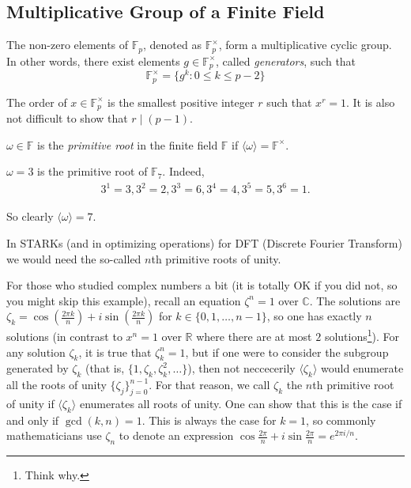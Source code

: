 \documentclass[../lecture-notes.tex]{subfiles}
\begin{document}
\subsection{Multiplicative Group of a Finite Field}

The non-zero elements of $\mathbb{F}_p$, denoted as $\mathbb{F}_p^{\times}$, form a multiplicative cyclic group. In other words, there exist elements $g \in \mathbb{F}_p^{\times}$, called \textit{generators}, such that
\begin{equation}
    \mathbb{F}_p^{\times} = \{g^k: 0 \leq k \leq p-2\}
\end{equation}

The order of $x \in \mathbb{F}_p^{\times}$ is the smallest positive integer $r$ such that $x^r=1$. It is also not difficult to show that $r \mid (p-1)$.

\begin{definition}
    $\omega \in \mathbb{F}$ is the \textit{primitive root} in the finite field $\mathbb{F}$ if $\langle\omega\rangle = \mathbb{F}^{\times}$.
\end{definition}

\begin{example}
    $\omega=3$ is the primitive root of $\mathbb{F}_7$. Indeed,
    \begin{equation}
        \begin{aligned}
            3^1=3, 3^2=2, 3^3=6, 3^4=4, 3^5=5, 3^6=1.
        \end{aligned}
    \end{equation}

    So clearly $\langle \omega \rangle = 7$.
\end{example}

In STARKs (and in optimizing operations) for DFT (Discrete Fourier Transform) we would need the so-called $n$th primitive roots of unity.

\begin{example}
    For those who studied complex numbers a bit (it is totally OK if you did not, so you might skip this example), recall an equation $\zeta^n=1$ over $\mathbb{C}$. The solutions are $\zeta_k = \cos\left(\frac{2\pi k}{n}\right) + i\sin\left(\frac{2\pi k}{n}\right)$ for $k\in\{0,1,\dots,n-1\}$, so one has exactly $n$ solutions (in contrast to $x^n=1$ over $\mathbb{R}$ where there are at most $2$ solutions\footnote{Think why.}). For any solution $\zeta_k$, it is true that $\zeta_k^n=1$, but if one were to consider the subgroup generated by $\zeta_k$ (that is, $\{1,\zeta_k, \zeta_k^2,\dots\}$), then not neccecerily $\langle \zeta_k \rangle$ would enumerate all the roots of unity $\{\zeta_j\}_{j=0}^{n-1}$. For that reason, we call $\zeta_k$ the $n$th primitive root of unity if $\langle \zeta_k \rangle$ enumerates all roots of unity. One can show that this is the case if and only if $\gcd(k,n)=1$. This is always the case for $k=1$, so commonly mathematicians use $\zeta_n$ to denote an expression $\cos \frac{2\pi}{n} + i\sin\frac{2\pi}{n} = e^{2\pi i/n}$.
\end{example}
\end{document}
